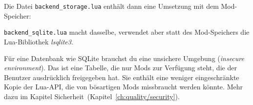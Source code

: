 Die Datei \texttt{backend\_\allowbreak{}storage.\allowbreak{}lua}
enthält dann eine Umsetzung mit dem Mod-Speicher:

\begin{Shaded}
\begin{Highlighting}[]
  \OperatorTok{=} \OperatorTok{()}
  \OperatorTok{=} \OperatorTok{\{\}}

 \OperatorTok{(}\OperatorTok{,} \OperatorTok{)}
    \OperatorTok{:}\OperatorTok{(}\OperatorTok{,} \OperatorTok{(}\OperatorTok{))}

 \OperatorTok{(}\OperatorTok{)}
     \OperatorTok{(}\OperatorTok{:}\OperatorTok{(}\OperatorTok{))}

 
\end{Highlighting}
\end{Shaded}

\texttt{backend\_\allowbreak{}sqlite.\allowbreak{}lua} macht dasselbe,
verwendet aber statt des Mod-Speichers die Lua-Bibliothek
\emph{lsqlite3}.

Für eine Datenbank wie SQLite brauchst du eine unsichere Umgebung
(\emph{insecure environment}). Das ist eine Tabelle, die nur Mods zur
Verfügung steht, die der Benutzer ausdrücklich freigegeben hat. Sie
enthält eine weniger eingeschränkte Kopie der Lua-API, die von
bösartigen Mods missbraucht werden könnte. Mehr dazu im Kapitel
Sicherheit~(Kapitel~\ref{ch:quality/security}).

\begin{Shaded}
\begin{Highlighting}[]
  \OperatorTok{=} \OperatorTok{()}
   
    \OperatorTok{(}\OperatorTok{)}

  \OperatorTok{=} \OperatorTok{(}\OperatorTok{)}
  
     \OperatorTok{=} 
\end{Highlighting}
\end{Shaded}

